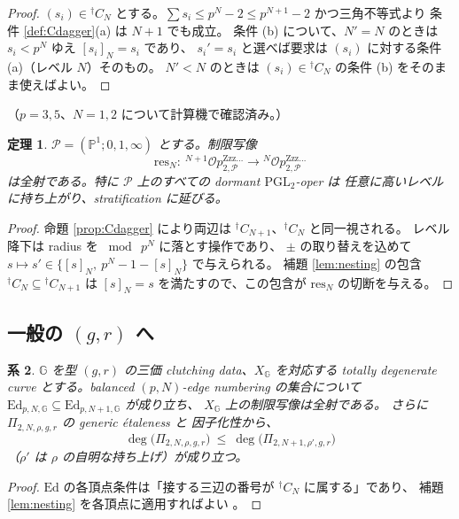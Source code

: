 \documentclass[a4paper,11pt]{ltjsarticle}
\theoremstyle{plain}
\newtheorem{theorem}{定理}[section]
\newtheorem{corollary}[theorem]{系}
\theoremstyle{definition}
\newcommand{\bbP}{\mathbb{P}}
\newcommand{\sP}{\mathscr{P}}
\newcommand{\Op}{\mathcal{O}p}
\newcommand{\Zzz}{\mathrm{Zzz\dots}}
\begin{document}
\begin{proof}
$(s_i)\in{}^{\dagger}C_N$ とする。$\sum s_i\le p^N-2\le p^{N+1}-2$ かつ三角不等式より
条件 \ref{def:Cdagger}(a) は $N+1$ でも成立。
条件 (b) について、$N'=N$ のときは $s_i<p^N$ ゆえ $[s_i]_N=s_i$ であり、
$s_i'=s_i$ と選べば要求は $(s_i)$ に対する条件 (a)（レベル $N$）そのもの。
$N'<N$ のときは $(s_i)\in{}^{\dagger}C_N$ の条件 (b) をそのまま使えばよい。
\end{proof}

（$p=3,5$、$N=1,2$ について計算機で確認済み。）

\begin{theorem}\label{thm:M03}
$\sP=(\bbP^1;0,1,\infty)$ とする。制限写像
\[
  \mathrm{res}_N:\ {}^{N+1}\Op^{\Zzz}_{2,\sP}\longrightarrow{}^{N}\Op^{\Zzz}_{2,\sP}
\]
は全射である。特に $\sP$ 上のすべての dormant $\mathrm{PGL}_2$-oper は
任意に高いレベルに持ち上がり、stratification に延びる。
\end{theorem}

\begin{proof}
命題 \ref{prop:Cdagger} により両辺は ${}^{\dagger}C_{N+1}$、${}^{\dagger}C_N$ と同一視される。
レベル降下は radius を $\bmod\ p^N$ に落とす操作であり、
$\pm$ の取り替えを込めて $s\mapsto s'\in\{[s]_N,\ p^N-1-[s]_N\}$ で与えられる。
補題 \ref{lem:nesting} の包含 ${}^{\dagger}C_N\subseteq{}^{\dagger}C_{N+1}$ は
$[s]_N=s$ を満たすので、この包含が $\mathrm{res}_N$ の切断を与える。
\end{proof}

\subsection{一般の $(g,r)$ へ}

\begin{corollary}\label{cor:general}
$\mathbb{G}$ を型 $(g,r)$ の三価 clutching data、$X_{\mathbb{G}}$ を対応する
totally degenerate curve とする。balanced $(p,N)$-edge numbering の集合について
$\mathrm{Ed}_{p,N,\mathbb{G}}\subseteq\mathrm{Ed}_{p,N+1,\mathbb{G}}$ が成り立ち、
$X_{\mathbb{G}}$ 上の制限写像は全射である。
さらに $\Pi_{2,N,\rho,g,r}$ の generic étaleness \cite[Thm.~C]{Wak2} と
因子化性から、
\[
  \deg\bigl(\Pi_{2,N,\rho,g,r}\bigr)\ \le\ \deg\bigl(\Pi_{2,N+1,\rho',g,r}\bigr)
\]
（$\rho'$ は $\rho$ の自明な持ち上げ）が成り立つ。
\end{corollary}

\begin{proof}
$\mathrm{Ed}$ の各頂点条件は「接する三辺の番号が ${}^{\dagger}C_N$ に属する」であり、
補題 \ref{lem:nesting} を各頂点に適用すればよい \cite[Thm.~E]{Wak2}。
\end{proof}
\end{document}
